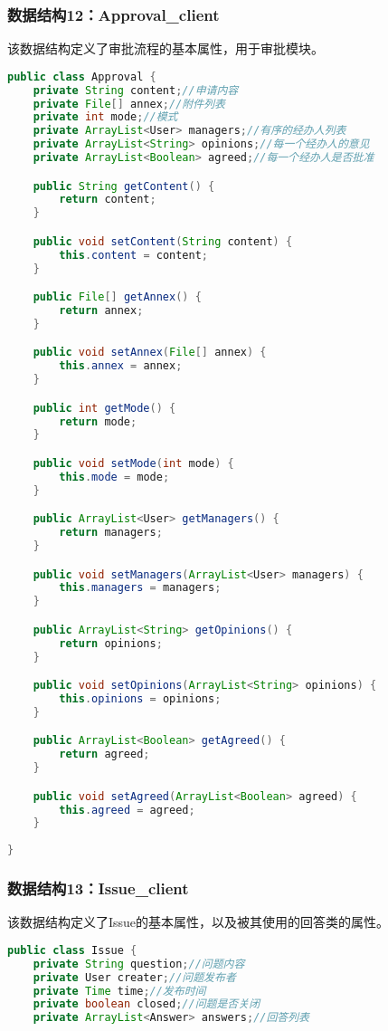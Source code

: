 {\subsubsection{数据结构12：Approval\_client}
该数据结构定义了审批流程的基本属性，用于审批模块。
\begin{lstlisting}[language=Java, caption=Approval定义]
public class Approval {
    private String content;//申请内容
    private File[] annex;//附件列表
    private int mode;//模式
    private ArrayList<User> managers;//有序的经办人列表
    private ArrayList<String> opinions;//每一个经办人的意见
    private ArrayList<Boolean> agreed;//每一个经办人是否批准

    public String getContent() {
        return content;
    }

    public void setContent(String content) {
        this.content = content;
    }

    public File[] getAnnex() {
        return annex;
    }

    public void setAnnex(File[] annex) {
        this.annex = annex;
    }

    public int getMode() {
        return mode;
    }

    public void setMode(int mode) {
        this.mode = mode;
    }

    public ArrayList<User> getManagers() {
        return managers;
    }

    public void setManagers(ArrayList<User> managers) {
        this.managers = managers;
    }

    public ArrayList<String> getOpinions() {
        return opinions;
    }

    public void setOpinions(ArrayList<String> opinions) {
        this.opinions = opinions;
    }

    public ArrayList<Boolean> getAgreed() {
        return agreed;
    }

    public void setAgreed(ArrayList<Boolean> agreed) {
        this.agreed = agreed;
    }
    
}
\end{lstlisting}

\subsubsection{数据结构13：Issue\_client}
该数据结构定义了Issue的基本属性，以及被其使用的回答类的属性。

\begin{lstlisting}[language=Java, caption=Issue定义]
public class Issue {
    private String question;//问题内容
    private User creater;//问题发布者
    private Time time;//发布时间
    private boolean closed;//问题是否关闭
    private ArrayList<Answer> answers;//回答列表


\end{lstlisting}}
